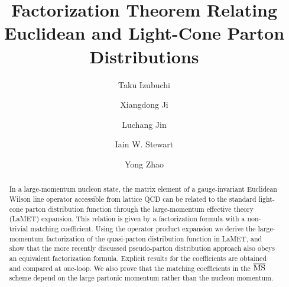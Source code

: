 \documentclass[prd,aps,twocolumn,preprintnumbers,showpacs,nofootinbib,superscriptaddress,notitlepage]{revtex4-1}
\begin{document}
	
	
\title{Factorization Theorem Relating Euclidean and Light-Cone Parton Distributions}
	
\author{Taku Izubuchi}

\author{Xiangdong Ji}

\author{Luchang Jin}

\author{Iain W. Stewart}

\author{Yong Zhao\vspace{0.2cm}}


\begin{abstract}
	
\vspace{0.05cm}
In a large-momentum nucleon state, the matrix element of a gauge-invariant Euclidean Wilson line operator accessible from lattice QCD can be related to the standard light-cone parton distribution function through the large-momentum effective theory (LaMET) expansion. This relation is given by a factorization formula with a non-trivial matching coefficient.  Using the operator product expansion we derive the large-momentum factorization of the quasi-parton distribution function in LaMET, and show that the more recently discussed pseudo-parton distribution approach also obeys an equivalent factorization formula.  Explicit results for the coefficients are obtained and compared at one-loop.  We also prove that the matching coefficients in the $\overline{\rm MS}$ scheme depend on the large partonic momentum rather than the nucleon momentum.	
\end{abstract}
\end{document}
